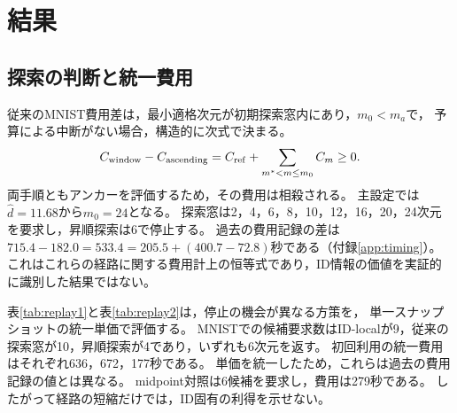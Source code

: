 \documentclass[11pt,a4paper]{ltjsarticle}
\begin{document}
\section{結果}\label{sec:results}

\subsection{探索の判断と統一費用}\label{sec:replayresults}
従来のMNIST費用差は，最小適格次元が初期探索窓内にあり，$m_0<m_a$で，
予算による中断がない場合，構造的に次式で決まる。
\begin{equation}
 C_{\rm window}-C_{\rm ascending}
 =C_{\rm ref}+\sum_{m^*<m\le m_0}C_m\ge0.
 \label{eq:dominance}
\end{equation}
両手順ともアンカーを評価するため，その費用は相殺される。
主設定では$\hat d=11.68$から$m_0=24$となる。
探索窓は2，4，6，8，10，12，16，20，24次元を要求し，昇順探索は6で停止する。
過去の費用記録の差は$715.4-182.0=533.4=205.5+(400.7-72.8)$秒である（付録\ref{app:timing}）。
これはこれらの経路に関する費用計上の恒等式であり，ID情報の価値を実証的に識別した結果ではない。

表\ref{tab:replay1}と表\ref{tab:replay2}は，停止の機会が異なる方策を，
単一スナップショットの統一単価で評価する。
MNISTでの候補要求数はID-localが9，従来の探索窓が10，昇順探索が4であり，いずれも6次元を返す。
初回利用の統一費用はそれぞれ636，672，177秒である。
単価を統一したため，これらは過去の費用記録の値とは異なる。
midpoint対照は6候補を要求し，費用は279秒である。
したがって経路の短縮だけでは，ID固有の利得を示せない。
\end{document}

